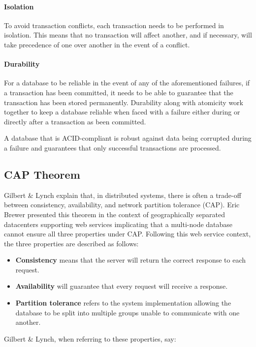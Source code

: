 \paragraph{Isolation}
To avoid transaction conflicts, each transaction needs to be performed in isolation. This means that no transaction will affect another, and if necessary, will take precedence of one over another in the event of a conflict.

\paragraph{Durability}
For a database to be reliable in the event of any of the aforementioned failures, if a transaction has been committed, it needs to be able to guarantee that the transaction has been stored permanently. Durability along with atomicity work together to keep a database reliable when faced with a failure either during or directly after a transaction as been committed.

A database that is ACID-compliant is robust against data being corrupted during a failure and guarantees that only successful transactions are processed.

\subsection{CAP Theorem}
\label{cap}
Gilbert \& Lynch \cite{cap} explain that, in distributed systems, there is often a trade-off between consistency, availability, and network partition tolerance (CAP). Eric Brewer presented this theorem in the context of geographically separated datacenters supporting web services implicating that a multi-node database cannot ensure all three properties under CAP. Following this web service context, the three properties are described as follows:

\begin{itemize}
    \item \textbf{Consistency} means that the server will return the correct response to each request.
    \item \textbf{Availability} will guarantee that every request will receive a response.
    \item \textbf{Partition tolerance} refers to the system implementation allowing the database to be split into multiple groups unable to communicate with one another.
\end{itemize}

Gilbert \& Lynch, when referring to these properties, say:

